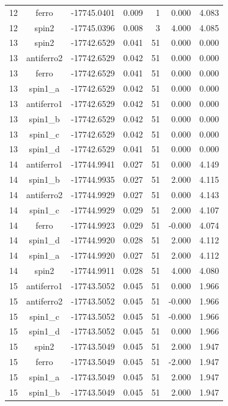 \begin{longtable}{@{}ccrrrrr@{}}
12 & ferro & -17745.0401 & 0.009 & 1 & 0.000 & 4.083 \\
12 & spin2 & -17745.0396 & 0.008 & 3 & 4.000 & 4.085 \\
\rowcolor{gray!20} 13 & spin2 & -17742.6529 & 0.041 & 51 & 0.000 & 0.000 \\
13 & antiferro2 & -17742.6529 & 0.042 & 51 & 0.000 & 0.000 \\
13 & ferro & -17742.6529 & 0.041 & 51 & 0.000 & 0.000 \\
13 & spin1\_a & -17742.6529 & 0.042 & 51 & 0.000 & 0.000 \\
13 & antiferro1 & -17742.6529 & 0.042 & 51 & 0.000 & 0.000 \\
13 & spin1\_b & -17742.6529 & 0.042 & 51 & 0.000 & 0.000 \\
13 & spin1\_c & -17742.6529 & 0.042 & 51 & 0.000 & 0.000 \\
13 & spin1\_d & -17742.6529 & 0.041 & 51 & 0.000 & 0.000 \\
\rowcolor{gray!20} 14 & antiferro1 & -17744.9941 & 0.027 & 51 & 0.000 & 4.149 \\
14 & spin1\_b & -17744.9935 & 0.027 & 51 & 2.000 & 4.115 \\
14 & antiferro2 & -17744.9929 & 0.027 & 51 & 0.000 & 4.143 \\
14 & spin1\_c & -17744.9929 & 0.029 & 51 & 2.000 & 4.107 \\
14 & ferro & -17744.9923 & 0.029 & 51 & -0.000 & 4.074 \\
14 & spin1\_d & -17744.9920 & 0.028 & 51 & 2.000 & 4.112 \\
14 & spin1\_a & -17744.9920 & 0.027 & 51 & 2.000 & 4.112 \\
14 & spin2 & -17744.9911 & 0.028 & 51 & 4.000 & 4.080 \\
\rowcolor{gray!20} 15 & antiferro1 & -17743.5052 & 0.045 & 51 & 0.000 & 1.966 \\
15 & antiferro2 & -17743.5052 & 0.045 & 51 & -0.000 & 1.966 \\
15 & spin1\_c & -17743.5052 & 0.045 & 51 & -0.000 & 1.966 \\
15 & spin1\_d & -17743.5052 & 0.045 & 51 & 0.000 & 1.966 \\
15 & spin2 & -17743.5049 & 0.045 & 51 & 2.000 & 1.947 \\
15 & ferro & -17743.5049 & 0.045 & 51 & -2.000 & 1.947 \\
15 & spin1\_a & -17743.5049 & 0.045 & 51 & 2.000 & 1.947 \\
15 & spin1\_b & -17743.5049 & 0.045 & 51 & 2.000 & 1.947 \\

\end{longtable}
